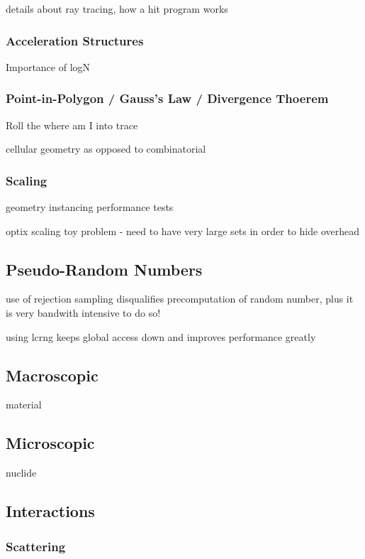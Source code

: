 details about ray tracing, how a hit program works

\subsubsection{Acceleration Structures}

Importance of logN


\subsubsection{Point-in-Polygon / Gauss's Law / Divergence Thoerem}

Roll the where am I into  trace

cellular geometry as opposed to combinatorial


\subsubsection{Scaling}

geometry instancing performance tests

optix scaling toy problem - need to have very large sets in order to hide overhead


\subsection{Pseudo-Random Numbers}

use of rejection sampling disqualifies precomputation of random number, plus it is very bandwith intensive to do so!

using lcrng keeps global access down and improves performance greatly

\subsection{Macroscopic}

material

\subsection{Microscopic}

nuclide

\subsection{Interactions}

\subsubsection{Scattering}

